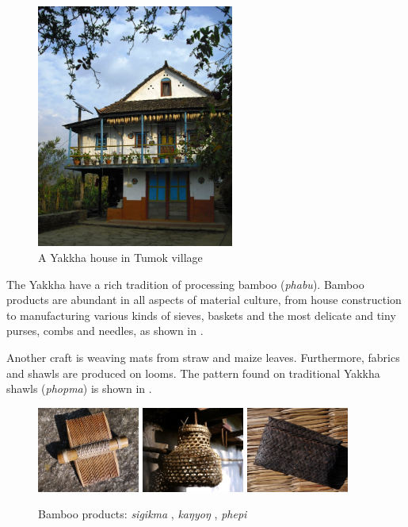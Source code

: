 \begin{figure}
\centering
\includegraphics[height=8cm]{figures/house.jpg}
\caption{A Yakkha house in Tumok village}\label{house}
\end{figure}


The Yakkha have a rich tradition of processing bamboo (\emph{phabu}). Bamboo products are abundant in all aspects  of material culture, from house construction to manufacturing various kinds of sieves, baskets and the most delicate and tiny purses, combs and needles, as shown in .

Another craft is weaving mats from straw and maize leaves. Furthermore, fabrics and shawls are produced on looms.  The pattern found on traditional Yakkha shawls (\emph{phopma}) is shown in . 


 \begin{figure}[h]
 \includegraphics[width=0.30\textwidth]{figures/comb.jpg}
 \hfill
 \includegraphics[width=0.30\textwidth]{figures/kangyong.jpg}
 \hfill
 \includegraphics[width=0.30\textwidth]{figures/phepi.jpg}
 \caption{Bamboo  products: \emph{sigikma} , \emph{kaŋyoŋ} , \emph{phepi} }\label{phabu}
 \end{figure}



